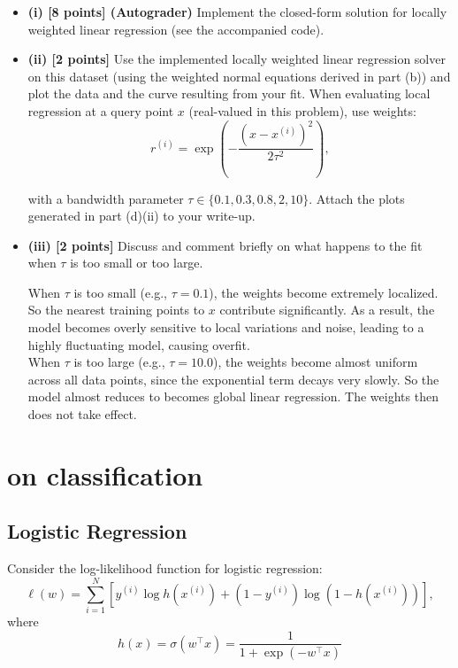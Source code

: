 \documentclass[lang=cn,11pt]{elegantbook}
\begin{document}
\begin{itemize}
    \item \textbf{(i) [8 points] (Autograder)} Implement the closed-form solution for locally weighted linear regression (see the accompanied code).
    \item \textbf{(ii) [2 points]} Use the implemented locally weighted linear regression solver on this dataset (using the weighted normal equations derived in part (b)) and plot the data and the curve resulting from your fit. When evaluating local regression at a query point \( x \) (real-valued in this problem), use weights:
    \[
    r^{(i)} = \exp\left(-\frac{(x - x^{(i)})^2}{2\tau^2}\right),
    \]

    with a bandwidth parameter \( \tau \in \{0.1, 0.3, 0.8, 2, 10\} \). Attach the plots generated in part (d)(ii) to your write-up.



    \item \textbf{(iii) [2 points]} Discuss and comment briefly on what happens to the fit when \( \tau \) is too small or too large.
    \begin{solution}
\noindent      When \( \tau \) is too small (e.g., \( \tau = 0.1 \)), the weights become extremely localized. So the nearest training points to \( x \) contribute significantly. As a result, the model becomes overly sensitive to local variations and noise, leading to a highly fluctuating model, causing overfit.\\
 \noindent       When \( \tau \) is too large (e.g., \( \tau = 10.0 \)), the weights become almost uniform across all data points, since the exponential term decays very slowly. So the model almost reduces to becomes global linear regression. The weights then does not take effect.
    \end{solution}

\end{itemize}


\chapter{on classification}

\section{Logistic Regression}

Consider the log-likelihood function for logistic regression:
\begin{equation}
    \ell(w) = \sum_{i=1}^{N} \left[ y^{(i)} \log h(x^{(i)}) + (1 - y^{(i)}) \log (1 - h(x^{(i)})) \right],
\end{equation}
where 
\begin{equation}
    h(x) = \sigma(w^\top x) = \frac{1}{1 + \exp(-w^\top x)}
\end{equation}
\end{document}

